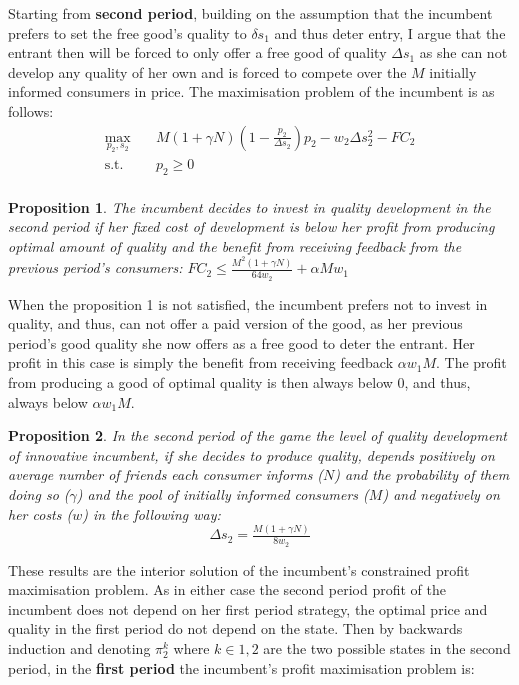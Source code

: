 \documentclass[13pt]{article}
\numberwithin{figure}{section}
\numberwithin{table}{section}
\theoremstyle{indented}
\newtheorem{proposition}{Proposition}[section]
\numberwithin{equation}{section} %
\begin{document}
Starting from \textbf{second period}, building on the assumption that the incumbent prefers to set the free good's quality to $\delta s_1$ and thus deter entry, I argue that the entrant then will be forced to only offer a free good of quality $\Delta s_1$ as she can not develop any quality of her own and is forced to compete over the $M$ initially informed consumers in price. 
The maximisation problem of the incumbent is as follows:
$$
\begin{aligned}
\max_{p_2,s_2} \quad &  M(1+\gamma N)(1-\tfrac{p_2}{\Delta s_2})p_2 - w_2\Delta s_2^2 - FC_2\\
\textrm{s.t.} \quad &p_2 \geq 0\\
\end{aligned}
$$



\begin{proposition}
The incumbent decides to invest in quality development in the second period if her fixed cost of development is below her profit from producing optimal amount of quality and the benefit from receiving feedback from the previous period's consumers:
$FC_2 \leq \tfrac{M^2(1+\gamma N)}{64w_2} + \alpha Mw_1$
\end{proposition}

When the proposition 1 is not satisfied, the incumbent prefers not to invest in quality, and thus, can not offer a paid version of the good, as her previous period's good quality she now offers as a free good to deter the entrant. Her profit in this case is simply the benefit from receiving feedback $\alpha w_1 M$. The profit from producing a good of optimal quality is then always below 0, and thus, always below $\alpha w_1 M$.

\begin{proposition}
In the second period of the game the level of quality development of innovative incumbent, if she decides to produce quality, depends positively on average number of friends each consumer informs ($N$) and the probability of them doing so ($\gamma$) and the pool of initially informed consumers ($M$) and negatively on her costs ($w$) in the following way:
$$\Delta s_2 = \tfrac{M(1+\gamma N)}{8w_2}$$
\end{proposition}

These results are the interior solution of the incumbent's constrained profit maximisation problem.
As in either case the second period profit of the incumbent does not depend on her first period strategy, the optimal price and quality in the first period do not depend on the state. Then by backwards induction and denoting $\pi_2^{k}$ where $k \in {1,2}$ are the two possible states in the second period, in the \textbf{first period} the incumbent's profit maximisation problem is:
\end{document}

